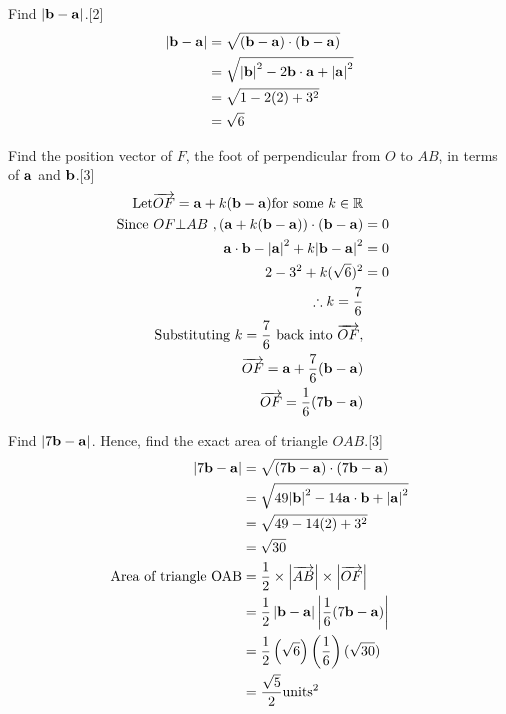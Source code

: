 \documentclass[12pt, a4 paper]{article}
\begin{document}
\begin{outline}[enumerate]
	\2 Find $\left| {{\bf{b}} - {\bf{a}}} \right|$.\hfill[2]
	\color{blue}
	\begin{align*}
		\left| {{\bf{b}} - {\bf{a}}} \right| & = \sqrt {({\bf{b}} - {\bf{a}}) \cdot ({\bf{b}} - {\bf{a}})} \\ &= \sqrt {{{\left| {\bf{b}} \right|}^2} - 2{\bf{b}} \cdot {\bf{a}} + {{\left| {\bf{a}} \right|}^2}} \\ &= \sqrt {1 - 2(2) + {3^2}} \\ &= \sqrt 6
	\end{align*}
	\color{black}

	\2 Find the position vector of $F$, the foot of perpendicular from $O$ to $AB$, in terms of $\bf{a}$ and $\bf{b}$.\hfill[3]
	\color{blue}
	\begin{align*}
		\textrm{Let}\overrightarrow {OF}  = {\bf{a}} + k({\bf{b}} - {\bf{a}})\textrm{for some }k \in \mathbb{R}\\
		{\textrm{Since }}OF \bot AB  {\textrm{ }},({\bf{a}} + k({\bf{b}} - {\bf{a}})) \cdot ({\bf{b}} - {\bf{a}}) & = 0 \\{\bf{a}} \cdot {\bf{b}} - {\left| {\bf{a}} \right|^2} + k{\left| {{\bf{b}} - {\bf{a}}} \right|^2} &= 0\\2 - {3^2} + k{(\sqrt 6 )^2} &= 0\\\therefore k = \dfrac{7}{6}\\\textrm{Substituting }k = \dfrac{7}{6}\textrm{ back into }\overrightarrow {OF} ,\\\overrightarrow {OF}  = {\bf{a}} + \dfrac{7}{6}({\bf{b}} - {\bf{a}})\\\overrightarrow {OF}  = \dfrac{1}{6}(7{\bf{b}} - {\bf{a}})
	\end{align*}
	\color{black}

	\2 	Find $\left| {7{\bf{b}} - {\bf{a}}} \right|$. Hence, find the exact area of triangle $OAB$.\hfill[3]
	\color{blue}
	\begin{align*}
		\left| {7{\bf{b}} - {\bf{a}}} \right| & = \sqrt {(7{\bf{b}} - {\bf{a}}) \cdot (7{\bf{b}} - {\bf{a}})}                                             \\ &= \sqrt {49{{\left| {\bf{b}} \right|}^2} - 14{\bf{a}} \cdot {\bf{b}} + {{\left| {\bf{a}} \right|}^2}} \\ &= \sqrt {49 - 14(2) + {3^2}} \\ &= \sqrt {30}\\
		{\textrm{Area of triangle OAB}}       & = \frac{1}{2} \times \left| {\overrightarrow {AB} } \right| \times \left| {\overrightarrow {OF} } \right| \\ &= \frac{1}{2}\left| {{\bf{b}} - {\bf{a}}} \right|\left| {\frac{1}{6}(7{\bf{b}} - {\bf{a}})} \right|\\ &= \frac{1}{2}\left( {\sqrt 6 } \right)\left( {\frac{1}{6}} \right)(\sqrt {30} )\\ &= \frac{{\sqrt 5 }}{2}{\textrm{unit}}{{\textrm{s}}^2}
	\end{align*}


\end{outline}
\end{document}
